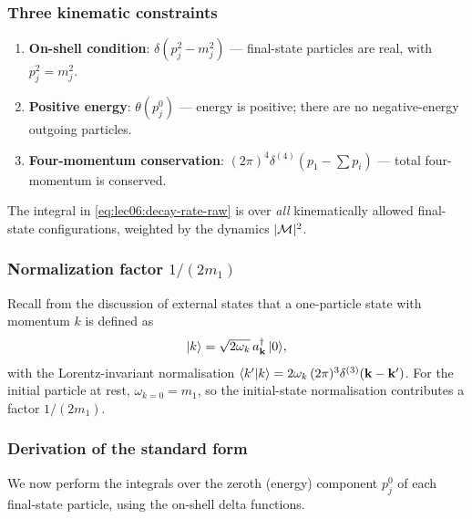 \documentclass[../main.tex]{subfiles}
\begin{document}
\subsubsection*{Three kinematic constraints}

\begin{enumerate}
  \item \textbf{On-shell condition}: $\delta(p_j^2 - m_j^2)$ — final-state particles are real, with $p_j^2 = m_j^2$.
  \item \textbf{Positive energy}: $\theta(p_j^0)$ — energy is positive; there are no negative-energy outgoing particles.
  \item \textbf{Four-momentum conservation}: $(2\pi)^4\delta^{(4)}(p_1 - \sum p_i)$ — total four-momentum is conserved.
\end{enumerate}

The integral in \eqref{eq:lec06:decay-rate-raw} is over \emph{all} kinematically allowed final-state configurations, weighted by the dynamics $|\mathcal{M}|^2$.

\subsubsection*{Normalization factor $1/(2m_1)$}

Recall from the discussion of external states that a one-particle state with momentum $k$ is defined as
\begin{equation}
  |k\rangle = \sqrt{2\omega_k}\, a_{\mathbf{k}}^\dagger\, |0\rangle,
  \label{eq:lec06:state-norm}
\end{equation}
with the Lorentz-invariant normalisation $\langle k'|k\rangle = 2\omega_k\,(2\pi)^3\delta^{(3)}(\mathbf{k}-\mathbf{k}')$.  For the initial particle at rest, $\omega_{k=0} = m_1$, so the initial-state normalisation contributes a factor $1/(2m_1)$.

\subsubsection*{Derivation of the standard form}

We now perform the integrals over the zeroth (energy) component $p_j^0$ of each final-state particle, using the on-shell delta functions.
\end{document}
